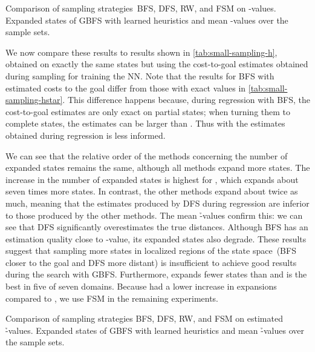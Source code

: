 \begin{table}[tb]
    \caption[Comparison of sampling strategies on \hstar-values.]{Comparison of sampling strategies~BFS, DFS, RW, and FSM on \hstar-values. Expanded states of GBFS with learned heuristics and mean \hstar-values over the sample sets.}
    \label{tab:small-sampling-hstar}
    \addmargin
    \centering
    
\end{table}

We now compare these results to results shown in \cref{tab:small-sampling-h}, obtained on exactly the same states but using the cost-to-goal estimates obtained during sampling for training the NN. Note that the results for BFS with estimated costs to the goal differ from those with exact values in \cref{tab:small-sampling-hstar}. This difference happens because, during regression with BFS, the cost-to-goal estimates are only exact on partial states; when turning them to complete states, the estimates can be larger than \hstar. Thus \hnnl{\bfs} with the estimates obtained during regression is less informed.

We can see that the relative order of the methods concerning the number of expanded states remains the same, although all methods expand more states. The increase in the number of expanded states is highest for \hnnl{\dfs}, which expands about seven times more states. In contrast, the other methods expand about twice as much, meaning that the estimates produced by DFS during regression are inferior to those produced by the other methods. The mean \h-values confirm this: we can see that DFS significantly overestimates the true distances. Although BFS has an estimation quality close to \hstar-value, its expanded states also degrade. These results suggest that sampling more states in localized regions of the state space~(BFS closer to the goal and DFS more distant) is insufficient to achieve good results during the search with GBFS. Furthermore, \hnnl{\bfsrw} expands fewer states than \hnnl{\rw} and is the best in five of seven domains. Because \hnnl{\bfsrw} had a lower increase in expansions compared to \hnnl{\rw}, we use FSM in the remaining experiments.

\begin{table}[tb]
    \caption[Comparison of sampling strategies on estimated \h-values.]{Comparison of sampling strategies BFS, DFS, RW, and FSM on estimated \h-values. Expanded states of GBFS with learned heuristics and mean \h-values over the sample sets.}
    \label{tab:small-sampling-h}
    \addmargin
    \centering
    
\end{table}

